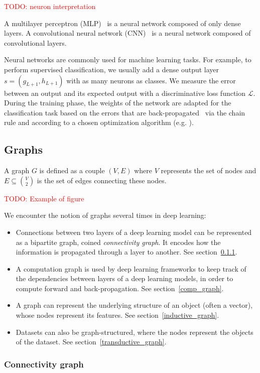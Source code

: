 \documentclass{article}
\theoremstyle{definition}
\newcommand{\todo}[1]{\textcolor{red}{TODO: #1}}
\begin{document}
\todo{neuron interpretation}

A multilayer perceptron (MLP)~\cite{hornik1989multilayer} is a neural network composed of only dense layers.
A convolutional neural network (CNN)~\cite{lecun1998gradient} is a neural network composed of convolutional layers.

Neural networks are commonly used for machine learning tasks. For example, to perform supervised classification, we usually add a dense output layer $s=(g_{L+1},h_{L+1})$ with as many neurons as classes. We measure the error between an output and its expected output with a discriminative loss function $\mathcal{L}$. During the training phase, the weights of the network are adapted for the classification task based on the errors that are back-propagated~\cite{hornik1989multilayer} via the chain rule and according to a chosen optimization algorithm (e.g. \cite{bottou2010large}).

\subsection{Graphs}

A graph $G$ is defined as a couple $(V,E)$ where $V$ represents the set of nodes and $E \subseteq\binom{V}{2}$ is the set of edges connecting these nodes.

\todo{Example of figure}

We encounter the notion of graphs several times in deep learning:
\begin{itemize}
\item Connections between two layers of a deep learning model can be represented as a bipartite graph, coined \emph{connectivity graph}. It encodes how the information is propagated through a layer to another. See section~\ref{con_graph}.
\item A computation graph is used by deep learning frameworks to keep track of the dependencies between layers of a deep learning models, in order to compute forward and back-propagation. See section~\ref{comp_graph}.
\item A graph can represent the underlying structure of an object (often a vector), whose nodes represent its features. See section~\ref{inductive_graph}.
\item Datasets can also be graph-structured, where the nodes represent the objects of the dataset. See section~\ref{transductive_graph}.
\end{itemize}

\subsubsection{Connectivity graph}
\label{con_graph}
\end{document}
